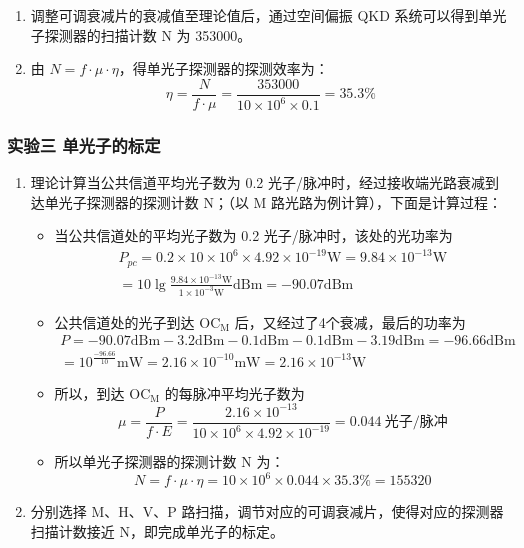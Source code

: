 \documentclass[dvipsnames, svgnames,a4paper,11pt]{article}
\begin{document}
\begin{enumerate}
\begin{itemize}
				\end{itemize}
			
			\item 调整可调衰减片的衰减值至理论值后，通过空间偏振 QKD 系统可以得到单光子探测器的扫描计数 N 为 353000。
			
			\item 由 $ N = f \cdot \mu \cdot \eta $，得单光子探测器的探测效率为：
				$$ \eta = \frac{N}{f \cdot \mu} = \frac{353000}{10 \times 10^{6} \times 0.1} = 35.3 \% $$

		\end{enumerate}
		

	\subsubsection{实验三 \quad 单光子的标定}

		\begin{enumerate}
			\item 理论计算当公共信道平均光子数为 0.2 光子/脉冲时，经过接收端光路衰减到达单光子探测器的探测计数 N；（以 M 路光路为例计算），下面是计算过程：
				\begin{itemize}
					\item 当公共信道处的平均光子数为 0.2 光子/脉冲时，该处的光功率为
						\begin{align*}
							P_{pc} = 0.2 \times 10 \times 10^{6} \times 4.92 \times 10^{-19} \mathrm{W} = 9.84 \times 10^{-13} \mathrm{W}	\\
							= 10 \lg \frac{9.84 \times 10^{-13} \mathrm{W}}{1 \times 10^{-3} \mathrm{W}} \mathrm{dBm} = -90.07 \mathrm{dBm} 
						\end{align*}

					\item 公共信道处的光子到达 $\mathrm{OC_M}$ 后，又经过了4个衰减，最后的功率为
						\begin{align*}
							P = -90.07 \mathrm{dBm} - 3.2 \mathrm{dBm} - 0.1 \mathrm{dBm} - 0.1 \mathrm{dBm} - 3.19 \mathrm{dBm} = -96.66 \mathrm{dBm}	\\
							= 10^{\frac{-96.66}{10}} \mathrm{mW} = 2.16 \times 10^{-10} \mathrm{mW} = 2.16 \times 10^{-13} \mathrm{W}
						\end{align*}

					\item 所以，到达 $\mathrm{OC_M}$ 的每脉冲平均光子数为 
						$$ \mu = \frac{P}{f \cdot E} = \frac{2.16 \times 10^{-13}}{10 \times 10^{6} \times 4.92 \times 10^{-19}} = 0.044 \ \text{光子/脉冲} $$

					\item 所以单光子探测器的探测计数 N 为：
						$$ N = f \cdot \mu \cdot \eta = 10 \times 10^{6} \times 0.044 \times 35.3 \% = 155320 $$
				\end{itemize}

			\item 分别选择 M、H、V、P 路扫描，调节对应的可调衰减片，使得对应的探测器扫描计数接近 N，即完成单光子的标定。
		\end{enumerate}
\end{document}
